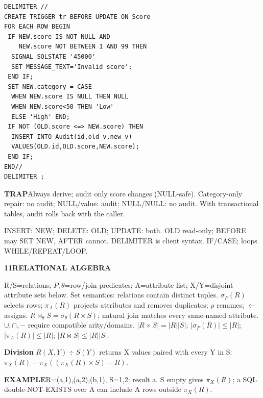 \documentclass[a4paper]{article}
\newcommand{\bodyfontsize}{5.55}
\newcommand{\bodyleading}{5.3}
\newcommand{\bodylineskiplimit}{-2pt}
\newcommand{\bodystyle}{%
  \fontsize{\bodyfontsize}{\bodyleading}\selectfont\setlength{\lineskiplimit}{\bodylineskiplimit}\RaggedRight
  \setlength{\abovedisplayskip}{.5pt}\setlength{\belowdisplayskip}{.5pt}%
  \setlength{\abovedisplayshortskip}{.3pt}\setlength{\belowdisplayshortskip}{.3pt}}
\newcommand{\topic}[2]{\par\addvspace{.45pt}\nointerlineskip%
  \begingroup\setlength{\fboxsep}{0.35pt}%
  \noindent\colorbox{structure}{\parbox{\dimexpr\linewidth-2\fboxsep\relax}{%
    \color{white}\fontsize{6.45}{6.8}\selectfont\bfseries #1\enspace #2}}%
  \endgroup\par\nobreak\vspace{.55pt}\nointerlineskip\nobreak}
\newenvironment{topicblock}
  {\par\bodystyle}
  {\par}
\newcommand{\key}[1]{\par\textcolor{structure}{\textbf{#1}}\enspace}
\newcommand{\note}[4]{\par\nointerlineskip\vspace{.25pt}\begingroup\setlength{\fboxsep}{0.1pt}%
  \noindent\colorbox{#1}{\parbox{\dimexpr\linewidth-2\fboxsep\relax}{%
    \RaggedRight\textcolor{#2}{\textbf{#3}}\enspace #4}}%
  \endgroup\par\nointerlineskip\vspace{.25pt}}
\newcommand{\trap}[1]{\note{warningbg}{warning}{TRAP}{#1}}
\newcommand{\ex}[1]{\note{examplebg}{example}{EXAMPLE}{#1}}
\newlength{\sheetwidth}
\newenvironment{sheetcolumns}[1]
  {\noindent\begin{minipage}[t]{#1\sheetwidth}\vspace{0pt}\bodystyle\ignorespaces}
  {\end{minipage}\par}
\begin{document}
\begin{sheetcolumns}{.254}
\begin{topicblock}
\begin{lstlisting}
DELIMITER //
CREATE TRIGGER tr BEFORE UPDATE ON Score
FOR EACH ROW BEGIN
 IF NEW.score IS NOT NULL AND
    NEW.score NOT BETWEEN 1 AND 99 THEN
  SIGNAL SQLSTATE '45000'
  SET MESSAGE_TEXT='Invalid score';
 END IF;
 SET NEW.category = CASE
  WHEN NEW.score IS NULL THEN NULL
  WHEN NEW.score<50 THEN 'Low'
  ELSE 'High' END;
 IF NOT (OLD.score <=> NEW.score) THEN
  INSERT INTO Audit(id,old_v,new_v)
  VALUES(OLD.id,OLD.score,NEW.score);
 END IF;
END//
DELIMITER ;
\end{lstlisting}
\trap{Always derive; audit only score changes (NULL-safe). Category-only repair: no audit; NULL/value: audit; NULL/NULL: no audit. With transactional tables, audit rolls back with the caller.}
INSERT: NEW; DELETE: OLD; UPDATE: both. OLD read-only; BEFORE may SET NEW, AFTER cannot. DELIMITER is client syntax. IF/CASE; loops WHILE/REPEAT/LOOP.
\end{topicblock}

\begin{topicblock}
\topic{11}{RELATIONAL ALGEBRA}
R/S=relations; $P,\theta$=row/join predicates; A=attribute list; X/Y=disjoint attribute sets below.
Set semantics: relations contain distinct tuples. $\sigma_P(R)$ selects rows; $\pi_A(R)$ projects attributes and removes duplicates; $\rho$ renames; $\leftarrow$ assigns. $R\bowtie_\theta S=\sigma_\theta(R\times S)$; natural join matches every same-named attribute. $\cup,\cap,-$ require compatible arity/domains.
$|R\times S|=|R||S|$; $|\sigma_P(R)|\leq|R|$; $|\pi_A(R)|\leq|R|$; $|R\bowtie S|\leq|R||S|$.
\key{Division}
$R(X,Y)\div S(Y)$ returns X values paired with every Y in S:
$\pi_X(R)-\pi_X((\pi_X(R)\times S)-R)$.
\ex{R={(a,1),(a,2),(b,1)}, S={1,2}: result {a}. S empty gives $\pi_X(R)$; a SQL double-NOT-EXISTS over A can include A rows outside $\pi_X(R)$.}
\end{topicblock}


\end{sheetcolumns}
\end{document}
